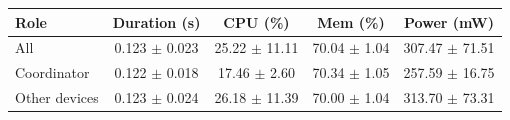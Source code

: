 \begin{tabular}{lcccc}
\hline
\textbf{Role} & \textbf{Duration (s)} & \textbf{CPU (\%)} & \textbf{Mem (\%)} & \textbf{Power (mW)} \\
\hline
All & 0.123 $\pm$ 0.023 & 25.22 $\pm$ 11.11 & 70.04 $\pm$ 1.04 & 307.47 $\pm$ 71.51 \\
Coordinator & 0.122 $\pm$ 0.018 & 17.46 $\pm$ 2.60 & 70.34 $\pm$ 1.05 & 257.59 $\pm$ 16.75 \\
Other devices & 0.123 $\pm$ 0.024 & 26.18 $\pm$ 11.39 & 70.00 $\pm$ 1.04 & 313.70 $\pm$ 73.31 \\
\hline
\end{tabular}
